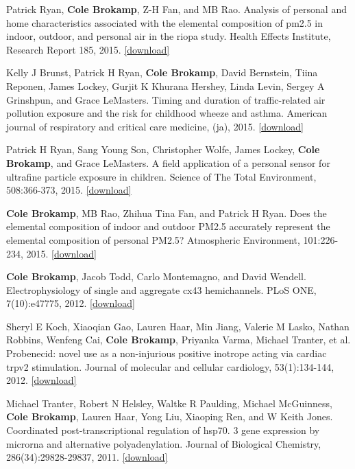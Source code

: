 Patrick Ryan, \textbf{Cole Brokamp}, Z-H Fan, and MB Rao. Analysis of
personal and home characteristics associated with the elemental
composition of pm2.5 in indoor, outdoor, and personal air in the riopa
study. Health Effects Institute, Research Report 185, 2015.
\href{https://github.com/cole-brokamp/cole-brokamp.github.io/raw/master/publications/RR185-Ryan.pdf}{{[}download{]}}

Kelly J Brunst, Patrick H Ryan, \textbf{Cole Brokamp}, David Bernstein,
Tiina Reponen, James Lockey, Gurjit K Khurana Hershey, Linda Levin,
Sergey A Grinshpun, and Grace LeMasters. Timing and duration of
traffic-related air pollution exposure and the risk for childhood wheeze
and asthma. American journal of respiratory and critical care medicine,
(ja), 2015.
\href{https://github.com/cole-brokamp/cole-brokamp.github.io/raw/master/publications/rccm\%252E201407-1314oc.pdf}{{[}download{]}}

Patrick H Ryan, Sang Young Son, Christopher Wolfe, James Lockey,
\textbf{Cole Brokamp}, and Grace LeMasters. A field application of a
personal sensor for ultrafine particle exposure in children. Science of
The Total Environment, 508:366-373, 2015.
\href{https://github.com/cole-brokamp/cole-brokamp.github.io/raw/master/publications/1-s2.0-S0048969714016556-main.pdf}{{[}download{]}}

\textbf{Cole Brokamp}, MB Rao, Zhihua Tina Fan, and Patrick H Ryan. Does
the elemental composition of indoor and outdoor PM2.5 accurately
represent the elemental composition of personal PM2.5? Atmospheric
Environment, 101:226-234, 2015.
\href{https://github.com/cole-brokamp/cole-brokamp.github.io/raw/master/publications/1-s2.0-S1352231014008814-main.pdf}{{[}download{]}}

\textbf{Cole Brokamp}, Jacob Todd, Carlo Montemagno, and David Wendell.
Electrophysiology of single and aggregate cx43 hemichannels. PLoS ONE,
7(10):e47775, 2012.
\href{https://github.com/cole-brokamp/cole-brokamp.github.io/raw/master/publications/journal.pone.0047775.pdf}{{[}download{]}}

Sheryl E Koch, Xiaoqian Gao, Lauren Haar, Min Jiang, Valerie M Lasko,
Nathan Robbins, Wenfeng Cai, \textbf{Cole Brokamp}, Priyanka Varma,
Michael Tranter, et al. Probenecid: novel use as a non-injurious
positive inotrope acting via cardiac trpv2 stimulation. Journal of
molecular and cellular cardiology, 53(1):134-144, 2012.
\href{https://github.com/cole-brokamp/cole-brokamp.github.io/raw/master/publications/nihms-373871.pdf}{{[}download{]}}

Michael Tranter, Robert N Helsley, Waltke R Paulding, Michael
McGuinness, \textbf{Cole Brokamp}, Lauren Haar, Yong Liu, Xiaoping Ren,
and W Keith Jones. Coordinated post-transcriptional regulation of hsp70.
3 gene expression by microrna and alternative polyadenylation. Journal
of Biological Chemistry, 286(34):29828-29837, 2011.
\href{https://github.com/cole-brokamp/cole-brokamp.github.io/raw/master/publications/J.\%20Biol.\%20Chem.-2011-Tranter-29828-37.pdf}{{[}download{]}}

